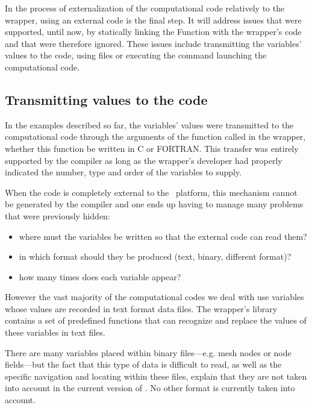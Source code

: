 
In the process of externalization of the computational code relatively to the wrapper, using an external code is the final step. It will address issues that were supported, until now, by statically linking the Function with the wrapper's code and that were therefore ignored. These issues include transmitting the variables' values to the code, using files or executing the command launching the computational code.

\subsection{Transmitting values to the code}

In the examples described so far, the variables' values were transmitted to the computational code through the arguments of the function called in the wrapper, whether this function be written in C or FORTRAN. This transfer was entirely supported by the compiler as long as the wrapper's developer had properly indicated the number, type and order of the variables to supply.

When the code is completely external to the \OT\ platform, this mechanism cannot be generated by the compiler and one ends up having to manage many problems that were previously hidden:
\begin{itemize}
\item where must the variables be written so that the external code can read them?
\item in which format should they be produced (text, binary, different format)?
\item how many times does each variable appear?
\end{itemize}

However the vast majority of the computational codes we deal with use variables whose values are recorded in text format data files. The wrapper's library contains a set of predefined functions that can recognize and replace the values of these variables in text files.

There are many variables placed within binary files---e.g. mesh nodes or node fields---but the fact that this type of data is difficult to read, as well as the specific navigation and locating within these files, explain that they are not taken into account in the current version of \OT. No other format is currently taken into account.

